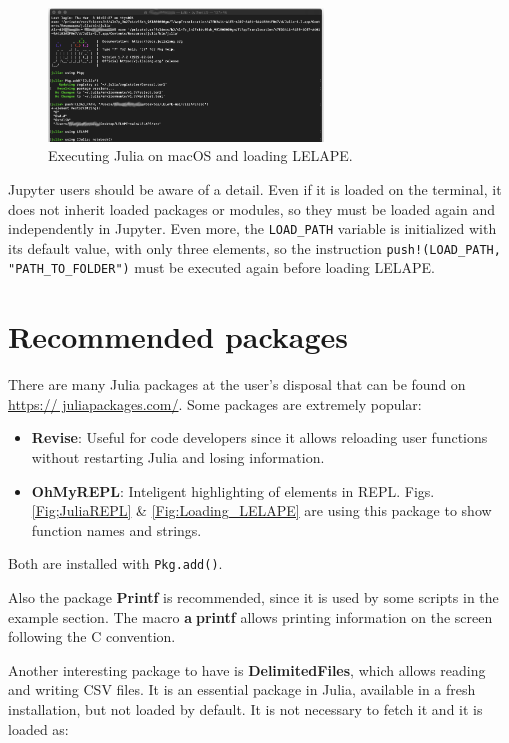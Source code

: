 \begin{figure}
	\centering
	\includegraphics[width=0.65\textwidth]{fig/Julia_in_macOS_anonymous}
	\caption{Executing Julia on macOS and loading LELAPE.}
	\label{Fig:Julia_in_macos}
\end{figure}

Jupyter users should be aware of a detail. Even if it is loaded on the terminal, it does not inherit loaded packages or modules, so they must be loaded again and independently in Jupyter. Even more, the \texttt{LOAD\_PATH} variable is initialized with its default value, with only three elements, so the instruction \texttt{push!(LOAD\_PATH, "PATH\_TO\_FOLDER")} must be executed again before loading LELAPE.

\section{Recommended packages}
%
There are many Julia packages at the user's disposal that can be found on \href{https://juliapackages.com/}{https:// juliapackages.com/}. Some packages are extremely popular:
\begin{itemize}
	\item \textbf{Revise}: Useful for code developers since it allows reloading user functions without restarting Julia and losing information.
	\item \textbf{OhMyREPL}: Inteligent highlighting of elements in REPL. Figs. \ref{Fig;JuliaREPL} \& \ref{Fig:Loading_LELAPE} are using this package to show function names and strings.
\end{itemize}

Both are installed with \texttt{Pkg.add()}. \vspace{5mm}

Also the package \textbf{Printf} is recommended, since it is used by some scripts in the example section. The macro \textbf{\textcircled{a}printf} allows printing information on the screen following the C convention.

Another interesting package to have is \textbf{DelimitedFiles}, which allows reading and writing CSV files. It is an essential package in Julia, available in a fresh installation, but not loaded by default. It is not necessary to fetch it and it is loaded as:
	
